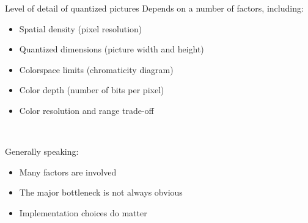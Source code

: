 \begin{frame}{Level of detail of quantized pictures}
  Depends on a number of factors, including:
  \begin{itemize}
  \item Spatial density (pixel resolution)
  \item Quantized dimensions (picture width and height)
  \item Colorspace limits (chromaticity diagram)
  \item Color depth (number of bits per pixel)
  \item Color resolution and range trade-off
  \end{itemize}~

  Generally speaking:
  \begin{itemize}
  \item Many factors are involved
  \item The major bottleneck is not always obvious
  \item Implementation choices do matter
  \end{itemize}
\end{frame}

